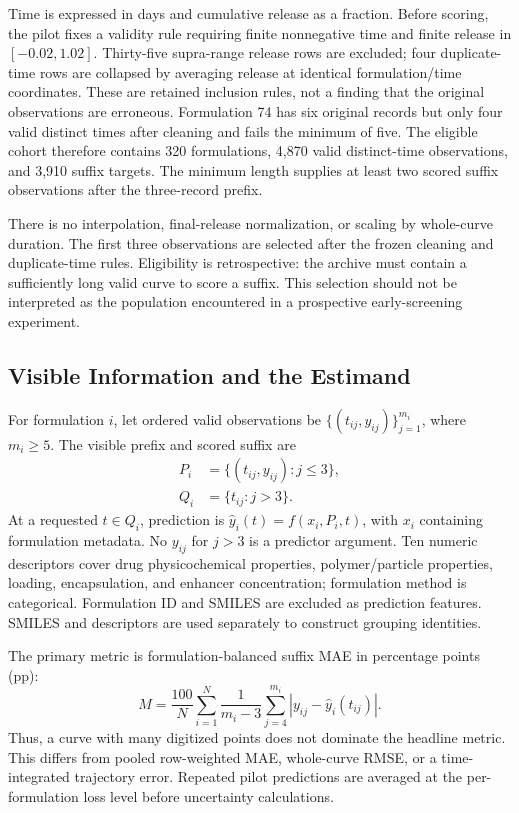 \documentclass[conference,letterpaper]{IEEEtran}
\begin{document}
Time is expressed in days and cumulative release as a fraction. Before scoring, the pilot fixes a validity rule requiring finite nonnegative time and finite release in $[-0.02,1.02]$. Thirty-five supra-range release rows are excluded; four duplicate-time rows are collapsed by averaging release at identical formulation/time coordinates. These are retained inclusion rules, not a finding that the original observations are erroneous. Formulation 74 has six original records but only four valid distinct times after cleaning and fails the minimum of five. The eligible cohort therefore contains 320 formulations, 4,870 valid distinct-time observations, and 3,910 suffix targets. The minimum length supplies at least two scored suffix observations after the three-record prefix.

There is no interpolation, final-release normalization, or scaling by whole-curve duration. The first three observations are selected after the frozen cleaning and duplicate-time rules. Eligibility is retrospective: the archive must contain a sufficiently long valid curve to score a suffix. This selection should not be interpreted as the population encountered in a prospective early-screening experiment.

\subsection{Visible Information and the Estimand}
For formulation $i$, let ordered valid observations be
$\{(t_{ij},y_{ij})\}_{j=1}^{m_i}$, where $m_i\geq5$.
The visible prefix and scored suffix are
\begin{align}
 P_i&=\{(t_{ij},y_{ij}):j\leq3\},\\
 Q_i&=\{t_{ij}:j>3\}.
\end{align}
At a requested $t\in Q_i$, prediction is $\hat y_i(t)=f(x_i,P_i,t)$, with $x_i$ containing formulation metadata. No $y_{ij}$ for $j>3$ is a predictor argument. Ten numeric descriptors cover drug physicochemical properties, polymer/particle properties, loading, encapsulation, and enhancer concentration; formulation method is categorical. Formulation ID and SMILES are excluded as prediction features. SMILES and descriptors are used separately to construct grouping identities.

The primary metric is formulation-balanced suffix MAE in percentage points (pp):
\begin{equation}\label{eq:mae}
 M=\frac{100}{N}\sum_{i=1}^{N}\frac{1}{m_i-3}
       \sum_{j=4}^{m_i}|y_{ij}-\hat y_i(t_{ij})|.
\end{equation}
Thus, a curve with many digitized points does not dominate the headline metric. This differs from pooled row-weighted MAE, whole-curve RMSE, or a time-integrated trajectory error. Repeated pilot predictions are averaged at the per-formulation loss level before uncertainty calculations.
\end{document}
